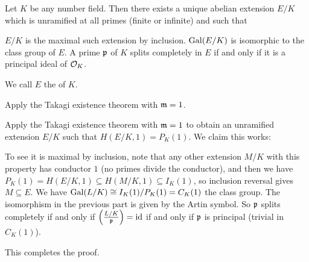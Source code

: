 \begin{dproblem}
	Let $K$ be any number field.
	Then there exists a unique abelian extension $E/K$
	which is unramified at all primes (finite or infinite)
	and such that
	\begin{itemize}
		\ii $E/K$ is the maximal such extension by inclusion.
		\ii $\operatorname{Gal}(E/K)$ is isomorphic to the class group of $E$.
		\ii A prime $\mathfrak p$ of $K$ splits completely in $E$
		if and only if it is a principal ideal of $\mathcal O_K$.
	\end{itemize}
	We call $E$ the  of $K$.
	\begin{hint}
		Apply the Takagi existence theorem with $\mathfrak m = 1$.
	\end{hint}
	\begin{sol}
		Apply the Takagi existence theorem with $\mathfrak m = 1$
		to obtain an unramified extension $E/K$ such that
		$H(E/K, 1) = P_K(1)$.
		We claim this works:
		\begin{itemize}
			\ii To see it is maximal by inclusion, note that any other extension $M/K$
			with this property has conductor $1$ (no primes divide the conductor),
			and then we have $P_K(1) = H(E/K, 1) \subseteq H(M/K, 1) \subseteq I_K(1)$,
			so inclusion reversal gives $M \subseteq E$.
			\ii We have $\operatorname{Gal}(L/K) \cong I_K(1) / P_K(1) = C_K(1)$ the class group.
			\ii The isomorphism in the previous part is given by the Artin symbol.
			So $\mathfrak p$ splits completely if and only if $\left( \frac{L/K}{\mathfrak p} \right) = \mathrm{id}$
			if and only if $\mathfrak p$ is principal (trivial in $C_K(1)$).
		\end{itemize}
		This completes the proof.
	\end{sol}
\end{dproblem}

